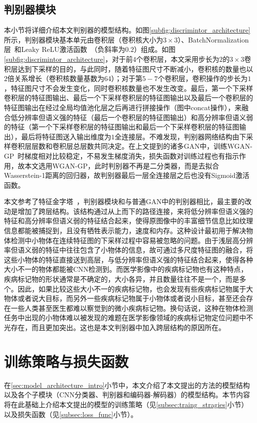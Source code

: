 \subsection{判别器模块}\label{subsec:discrimintor_model}
本小节将详细介绍本文判别器的模型结构。如图\ref{subfig:discrimintor_architecture}所示，判别器模块基本单元由卷积层（卷积核大小为$3\times 3$）、BatchNormalization层~\cite{ioffe2015batch}和Leaky ReLU激活函数~\cite{maas2013rectifier}（负斜率为$0.2$）组成。如图\ref{subfig:discrimintor_architecture}，对于前$4$个卷积层，本文采用步长为$2$的$3\times 3$卷积层达到下采样的目的，与此同时，随着特征图尺寸不断减小，卷积核的数量也以$2$倍关系增长（卷积核数量基数为64）；对于第$5-7$个卷积层，卷积操作的步长为$1$，特征图尺寸不会发生变化，同时卷积核数量也不发生改变。最后，第一个下采样卷积层的特征图输出、最后一个下采样卷积层的特征图输出以及最后一个卷积层的特征图输出在经过全局均值池化层之后再进行拼接操作（图中concat操作），来融合低分辨率但语义强的特征（最后一个卷积层的特征图输出）和高分辨率但语义弱的特征（第一个下采样卷积层的特征图输出和最后一个下采样卷积层的特征图输出），最后将特征图送入输出维度为$1$全连接层。不难发现，判别器网络结构由下采样卷积层层数和卷积层总层数共同决定。在上文提到的诸多GAN中，训练WGAN-GP~\cite{gulrajani2017improved}时梯度相对比较稳定，不易发生梯度消失，损失函数对训练过程也有指示作用，故本文选用WGAN-GP，此时判别器不再是二分类器，而是去拟合Wasserstein-1距离的回归器，故判别器最后一层全连接层之后也没有Sigmoid激活函数。

本文参考了特征金字塔~\cite{lin2017feature}，判别器模块和与普通GAN中的判别器相比，最主要的改动是增加了跨层结构。该结构通过从上而下的路径连接，来将低分辨率但语义强的特征和高分辨率但语义弱的特征结合起来，使得原图像中的丰富细节信息比如纹理信息都能被捕捉到，且没有牺牲表示能力，速度和内存。这种设计最初用于解决物体检测中小物体在连续特征图的下采样过程中容易被忽略的问题。由于浅层高分辨率但语义弱的特征中往往包含了小物体的信息，故可通过多尺度特征图的融合，将这些小物体的特征直接送到高层，与低分辨率但语义强的特征结合起来，使得各种大小不一的物体都能被CNN检测到。而医学影像中的疾病标记物也有这种特点，疾病标记物的形状通常是不确定的，大小各异，并且数量往往不是一个，而是多个。因此，如果比较这些大小不一的疾病标记物，也会发现有些疾病标记物属于大物体或者说大目标，而另外一些疾病标记物属于小物体或者说小目标，甚至还会存在一些人类甚至医生都难以察觉到的微小疾病标记物。换句话说，这种在物体检测任务中出现的小物体难以被发现的难题在医学影像领域的疾病标记物定位问题中不光存在，而且更加突出。这也是本文判别器中加入跨层结构的原因所在。

\section{训练策略与损失函数}\label{sec:loss_func_training_stragies}
在\ref{sec:model_architecture_intro}小节中，本文介绍了本文提出的方法的模型结构以及各个子模块（CNN分类器、判别器和编码器-解码器）的模型结构。本节内容将在此基础上介绍本文提出的模型的训练策略（见\ref{subsec:traing_stragies}小节）以及损失函数（见\ref{subsec:loss_func}小节）。

